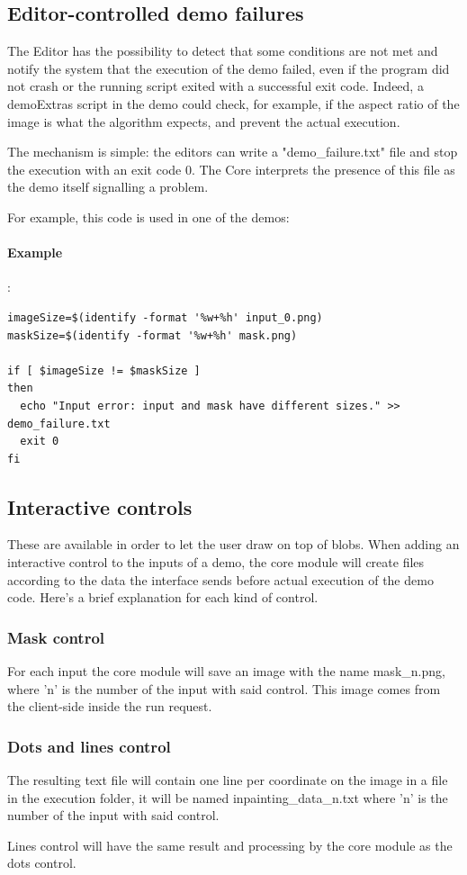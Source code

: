 \subsection{Editor-controlled demo failures}
The Editor has the possibility to detect that some conditions are not met and notify the system that the execution of the demo failed, even if the program did not crash or the running script exited with a successful exit code. Indeed, a demoExtras script in the demo could check, for example, if the aspect ratio of the image is what the algorithm expects, and prevent the actual execution.

The mechanism is simple: the editors can write a "demo\_failure.txt" file and stop the execution with an exit
code 0. The Core interprets the presence of this file as the demo itself signalling a problem.

For example, this code is used in one of the demos:
\paragraph{Example}:\\
\begin{verbatim}
imageSize=$(identify -format '%w+%h' input_0.png)
maskSize=$(identify -format '%w+%h' mask.png)

if [ $imageSize != $maskSize ]
then
  echo "Input error: input and mask have different sizes." >> demo_failure.txt
  exit 0
fi
\end{verbatim} 


\subsection{Interactive controls}
These are available in order to let the user draw on top of blobs. When adding an interactive control to the inputs of a demo, the core module will create files according to the data the interface sends before actual execution of the demo code. Here's a brief explanation for each kind of control.

\subsubsection{Mask control}
 For each input the core module will save an image with the name mask\_n.png, where 'n' is the number of the input with said control. This image comes from the client-side inside the run request.

\subsubsection{Dots and lines control}
The resulting text file will contain one line per coordinate on the image in a file in the execution folder, it will be named inpainting\_data\_n.txt where 'n' is the number of the input with said control.

Lines control will have the same result and processing by the core module as the dots control.
